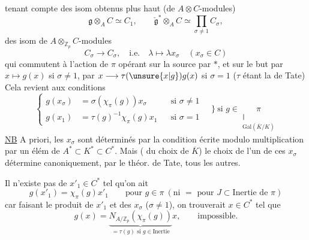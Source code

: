 tenant compte des isom  obtenus plus haut (de $A\otimes C$-modules)
\[
\mathfrak g\otimes_A C\simeq C_1,\qquad\check{\mathfrak g}^{*}\otimes_A C\simeq\prod_{\sigma\ne1}C_\sigma,
\]
  des isom de $A\otimes_{\mathbb Z_p}C$-modules
\[
C_\sigma\longrightarrow C_\sigma,\quad\text{i.e.}\quad\lambda\longmapsto\lambda x_\sigma\quad(x_\sigma\in C)
\]
qui commutent à l'action de $\pi$ opérant sur la source par $*$, et sur le but par  $x\longmapsto g(x)$ si $\sigma\ne1$, par $x\longrightarrow\tau(\unsure{x|g})g(x)$ si $\sigma=1$ ($\tau$ étant la  de Tate) Cela revient aux conditions
\[
\boxed{\left\{\begin{aligned}
g(x_\sigma)&=\sigma(\chi_\pi(g))x_\sigma&&\text{si }\sigma\ne1\\
g(x_1)&=\tau(g)^{-1}\chi_\pi(g)x_1&&\text{si }\sigma=1
\end{aligned}\right.\quad\Biggr\}\ \text{si }g\in\underset{\substack{\Vert\\\mathrm{Gal}(\overline K/K)}}{\pi}}
\]
\uline{NB} A priori, les $x_\sigma$ sont déterminés par la condition écrite modulo multiplication par un élém de $A^*\subset K^*\subset C^*$. Mais  ( du choix de $\overline K$) le choix de l'un de ces $x_\sigma$  détermine canoniquement, par le théor. de Tate, tous les autres. 

Il n'existe pas de $x'_1\in C^*$ tel qu'on ait
\[
g(x'_1)=\chi_\pi(g)x'_1\qquad\text{pour }g\in\pi\ (\text{ni }=\text{ pour }J\subset\text{Inertie de }\pi)
\]
car faisant le produit de $x'_1$ et des $x_\sigma$ ($\sigma\ne1$), on trouverait $x\in C^*$ tel que
\[
g(x)=\underbrace{N_{A/\mathbb Z_p}(\chi_\pi(g))}_{=\tau(g)\text{ si }g\in\text{Inertie}}x,\qquad\text{impossible.}
\]

